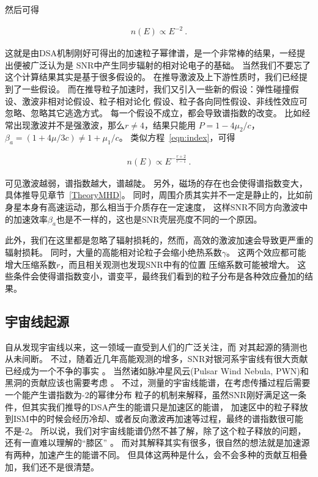 然后可得

\begin{equation}
  \label{eqn:spec}
    \begin{aligned}
      n(E) \propto E^{-2} \ .
    \end{aligned}
\end{equation}

这就是由DSA机制刚好可得出的加速粒子幂律谱，是一个非常棒的结果，一经提出便被广泛认为是
SNR中产生同步辐射的相对论电子的基础。
当然我们不要忘了这个计算结果其实是基于很多假设的。
在推导激波及上下游性质时，我们已经提到了一些假设。
而在推导粒子加速时，我们又引入一些新的假设：弹性碰撞假设、激波非相对论假设、粒子相对论化
假设、粒子各向同性假设、非线性效应可忽略、忽略其它逃逸方式。
每一个假设不成立，都会导致谱指数的改变。
比如经常出现激波并不是强激波，那么$r\neq4$，结果只能用
$P=1-4\mu_2/c$，$\beta_a=(1+4\mu/3c)\neq1+\mu_1/c$。
类似方程~\ref{eqn:index}，可得

\begin{equation}
    \begin{aligned}
      n(E) \propto E^{-\frac{r+2}{r-1}} \ .
    \end{aligned}
\end{equation}

可见激波越弱，谱指数越大，谱越陡。
另外，磁场的存在也会使得谱指数变大，具体推导见章节~\ref{TheoryMHD}。
同时，周围介质其实并不一定是静止的，比如前身星本身有高速运动，那么相当于介质存在一定速度，
这样SNR不同方向激波中的加速效率$\beta_a$也是不一样的，这也是SNR壳层亮度不同的一个原因。

此外，我们在这里都是忽略了辐射损耗的，然而，高效的激波加速会导致更严重的辐射损耗。
同时，大量的高能相对论粒子会缩小绝热系数$\gamma$。
这两个效应都可能增大压缩系数$r$\citep{Ellison2005}，而且相关观测也发现SNR中有的位置
压缩系数可能被增大\citep{Voelk2007}。
这些条件会使得谱指数变小，谱变平，最终我们看到的粒子分布是各种效应叠加的结果。



\subsection{宇宙线起源}
自从\citet{hess1912beobachtungen}发现宇宙线以来，这一领域一直受到人们的广泛关注，而
对其起源的猜测也从未间断\citep{Reynolds2008a}。
不过，随着近几年高能观测的增多，SNR对银河系宇宙线有很大贡献已经成为一个不争的事实
\citep{Ackermann2013, Joubert2016, Jogler2016}。
当然诸如脉冲星风云(Pulsar Wind Nebula, PWN)和黑洞的贡献应该也需要考虑
\citep{Abeysekara2018, Profumo2018}。
不过，测量的宇宙线能谱，在考虑传播过程后需要一个能产生谱指数为-2的幂律分布
粒子的机制来解释，虽然SNR刚好满足这一条件，但其实我们推导的DSA产生的能谱只是加速区的能谱，
加速区中的粒子释放到ISM中的时候会经历冷却、或者反向激波再加速等过程，最终的谱指数很可能
不是-2。
所以说，我们对宇宙线能谱仍然不甚了解，除了这个粒子释放的问题，还有一直难以理解的“膝区”
\citep{Hoerandel2003}。
而对其解释其实有很多，很自然的想法就是加速源有两种，加速产生的能谱不同。
但具体这两种是什么，会不会多种的贡献互相叠加，我们还不是很清楚。

